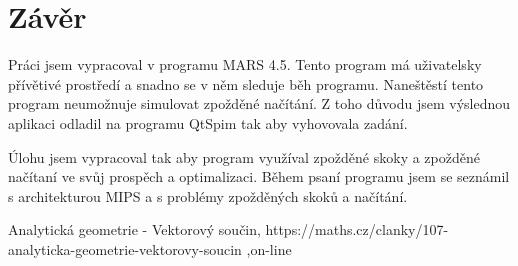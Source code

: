 \chapter{Závěr}
Práci jsem vypracoval v programu MARS 4.5. Tento program má uživatelsky přívětivé prostředí a snadno se v něm sleduje běh programu. Naneštěstí tento program neumožnuje simulovat zpožděné načítání. Z toho důvodu jsem výslednou aplikaci odladil na programu QtSpim tak aby vyhovovala zadání. \par
Úlohu jsem vypracoval tak aby program využíval zpožděné skoky a zpožděné načítaní ve svůj prospěch a optimalizaci. Během psaní programu jsem se seznámil s architekturou MIPS a s problémy zpožděných skoků a načítání.
	
\begin{thebibliography}{0}
Analytická geometrie - Vektorový součin, https://maths.cz/clanky/107-analyticka-geometrie-vektorovy-soucin ,on-line
\end{thebibliography}
 